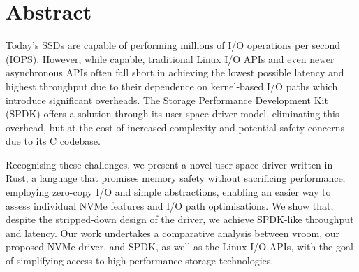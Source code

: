 \chapter{Abstract}
Today's SSDs are capable of performing millions of I/O operations per second (IOPS). However, while capable, traditional Linux I/O APIs and even newer asynchronous APIs often fall short in achieving the lowest possible latency and highest throughput due to their dependence on kernel-based I/O paths which introduce significant overheads. The Storage Performance Development Kit (SPDK) offers a solution through its user-space driver model, eliminating this overhead, but at the cost of increased complexity and potential safety concerns due to its C codebase.

Recognising these challenges, we present a novel user space driver written in Rust, a language that promises memory safety without sacrificing performance, employing zero-copy I/O and simple abstractions, enabling an easier way to assess individual NVMe features and I/O path optimisations. We show that, despite the stripped-down design of the driver, we achieve SPDK-like throughput and latency. Our work undertakes a comparative analysis between vroom, our proposed NVMe driver, and SPDK, as well as the Linux I/O APIs, with the goal of simplifying access to high-performance storage technologies.
